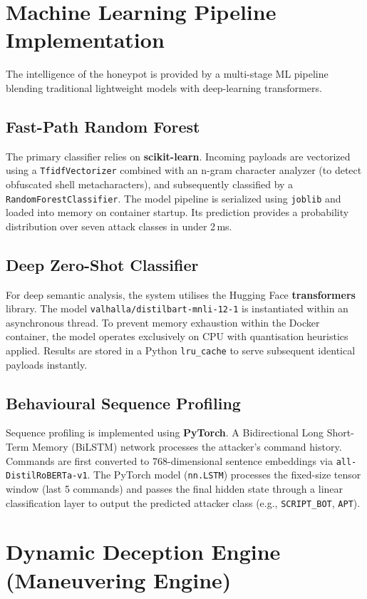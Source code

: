\section{Machine Learning Pipeline Implementation}

The intelligence of the honeypot is provided by a multi-stage ML pipeline blending traditional lightweight models with deep-learning transformers.

\subsection{Fast-Path Random Forest}
The primary classifier relies on \textbf{scikit-learn}. Incoming payloads are vectorized using a \texttt{TfidfVectorizer} combined with an n-gram character analyzer (to detect obfuscated shell metacharacters), and subsequently classified by a \texttt{RandomForestClassifier}. The model pipeline is serialized using \texttt{joblib} and loaded into memory on container startup. Its prediction provides a probability distribution over seven attack classes in under 2\,ms.

\subsection{Deep Zero-Shot Classifier}
For deep semantic analysis, the system utilises the Hugging Face \textbf{transformers} library. The model \texttt{valhalla/distilbart-mnli-12-1} is instantiated within an asynchronous thread. To prevent memory exhaustion within the Docker container, the model operates exclusively on CPU with quantisation heuristics applied. Results are stored in a Python \texttt{lru\_cache} to serve subsequent identical payloads instantly.

\subsection{Behavioural Sequence Profiling}
Sequence profiling is implemented using \textbf{PyTorch}. A Bidirectional Long Short-Term Memory (BiLSTM) network processes the attacker's command history. Commands are first converted to 768-dimensional sentence embeddings via \texttt{all-DistilRoBERTa-v1}. The PyTorch model (\texttt{nn.LSTM}) processes the fixed-size tensor window (last 5 commands) and passes the final hidden state through a linear classification layer to output the predicted attacker class (e.g., \texttt{SCRIPT\_BOT}, \texttt{APT}).

\section{Dynamic Deception Engine (Maneuvering Engine)}

